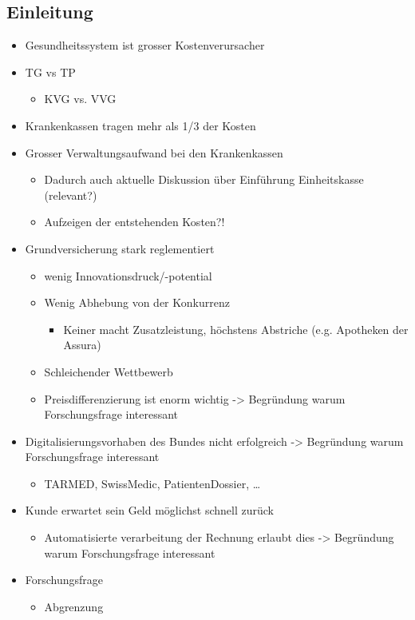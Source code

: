 \documentclass[12pt, twoside, table]{extarticle}
\begin{document}
\subsection{Einleitung}
\begin{itemize}
    \item Gesundheitssystem ist grosser Kostenverursacher
    \item TG vs TP
    \begin{itemize}
         \item KVG vs. VVG
    \end{itemize}
	 \item Krankenkassen tragen mehr als 1/3 der Kosten
	 \item Grosser Verwaltungsaufwand bei den Krankenkassen
     \begin{itemize}
        \item Dadurch auch aktuelle Diskussion über Einführung Einheitskasse (relevant?)
        \item Aufzeigen der entstehenden Kosten?!
    \end{itemize}
	\item Grundversicherung stark reglementiert
    \begin{itemize}
        \item wenig Innovationsdruck/-potential
        \item Wenig Abhebung von der Konkurrenz
        \begin{itemize}
			\item Keiner macht Zusatzleistung, höchstens Abstriche (e.g. Apotheken der Assura)
        \end{itemize}
        \item Schleichender Wettbewerb
        \item Preisdifferenzierung ist enorm wichtig -> Begründung warum Forschungsfrage interessant
    \end{itemize}
	\item Digitalisierungsvorhaben des Bundes nicht erfolgreich -> Begründung warum Forschungsfrage interessant
    \begin{itemize}
        \item TARMED, SwissMedic, PatientenDossier, …
    \end{itemize}
    \item Kunde erwartet sein Geld möglichst schnell zurück
    \begin{itemize}
        \item Automatisierte verarbeitung der Rechnung erlaubt dies  -> Begründung warum Forschungsfrage interessant
    \end{itemize}
    \item Forschungsfrage
    \begin{itemize}
        \item Abgrenzung
    \end{itemize}
\end{itemize}
	
\end{document}
